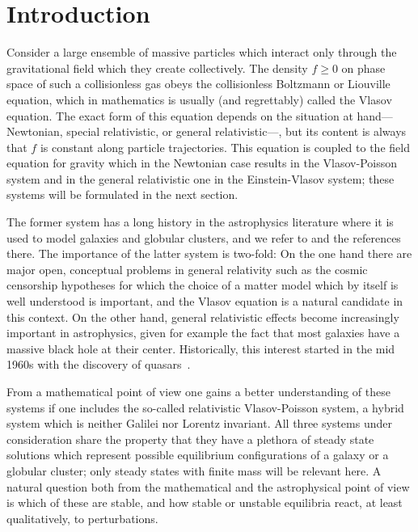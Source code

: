 \documentclass[11pt]{article}
\begin{document}
\section{Introduction}
\setcounter{equation}{0}
%
%
Consider a large ensemble of massive particles which interact only through the
gravitational field which they create collectively. The density $f\geq 0$ on
phase space of such a collisionless gas obeys the collisionless Boltzmann
or Liouville equation, which in mathematics is usually (and regrettably)
called the Vlasov equation. The exact form of this equation depends on
the situation at hand---Newtonian, special relativistic, or general
relativistic---, but its content is always that $f$ is constant along
particle trajectories. This equation is coupled to the field equation for
gravity which in the Newtonian case results in the Vlasov-Poisson system
and in the general relativistic one in the Einstein-Vlasov system;
these systems will be formulated in the next section.

The former system has a long history in the astrophysics literature
where it is used to model galaxies and globular clusters,
and we refer to \cite{BiTr,FrPo1984} and the references there.
The importance of the
latter system is two-fold: On the one hand there are major open, conceptual
problems in general relativity such as the cosmic censorship hypotheses
for which the choice of a matter model which by itself is well understood
is important, and the Vlasov equation is a natural candidate in this context.
On the other hand, general relativistic effects become
increasingly important in astrophysics,
given for example the fact that most galaxies have
a massive black hole at their center. Historically, this interest started
in the mid 1960s with the discovery of
quasars~\cite{BKZ,BKThorne1970,ZePo}. 

From a mathematical point of view one gains a better understanding of these
systems if one includes the so-called relativistic Vlasov-Poisson system,
a hybrid system which is neither Galilei nor Lorentz invariant.
All three systems under consideration share the property that they
have a plethora of steady state solutions which represent possible
equilibrium configurations of a galaxy or a globular cluster;
only steady states with finite mass will be relevant here.
A natural question both from
the mathematical and the astrophysical point of view is which of these
are stable, and how stable or unstable equilibria react, at least
qualitatively, to perturbations.
\end{document}
